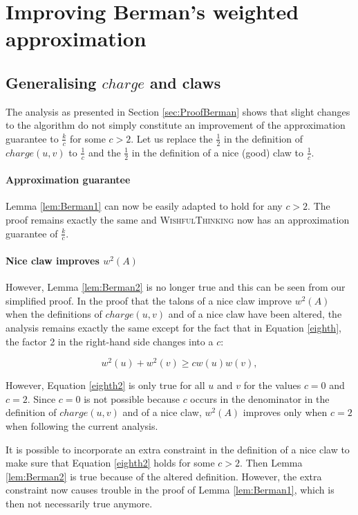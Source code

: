 \section{Improving Berman's weighted approximation}\label{sec:DiscBerman}

\subsection{Generalising $charge$ and claws}\label{subsec:DiscBerman1}

The analysis as presented in Section \ref{sec:ProofBerman} shows that slight changes to the algorithm do not simply constitute an improvement of the approximation guarantee to $\frac{k}{c}$ for some $c > 2$. Let us replace the $\frac{1}{2}$ in the definition of $charge(u,v)$ to $\frac{1}{c}$ and the $\frac{1}{2}$ in the definition of a nice (good) claw to $\frac{1}{c}$.

\paragraph{Approximation guarantee} Lemma \ref{lem:Berman1} can now be easily adapted to hold for any $c>2$. The proof remains exactly the same and \textsc{WishfulThinking} now has an approximation guarantee of $\frac{k}{c}$.

\paragraph{Nice claw improves $w^2(A)$} However, Lemma \ref{lem:Berman2} is no longer true and this can be seen from our simplified proof. In the proof that the talons of a nice claw improve $w^2(A)$ when the definitions of $charge(u,v)$ and of a nice claw have been altered, the analysis remains exactly the same except for the fact that in Equation \eqref{eighth}, the factor 2 in the right-hand side changes into a $c$:

\begin{equation}\label{eighth2}
w^2(u) + w^2(v) \geq cw(u)w(v),
\end{equation}

However, Equation \eqref{eighth2} is only true for all $u$ and $v$ for the values $c=0$ and $c=2$. Since $c=0$ is not possible because $c$ occurs in the denominator in the definition of $charge(u,v)$ and of a nice claw, $w^2(A)$ improves only when $c=2$ when following the current analysis.

It is possible to incorporate an extra constraint in the definition of a nice claw to make sure that Equation \eqref{eighth2} holds for some $c > 2$. Then Lemma \ref{lem:Berman2} is true because of the altered definition. However, the extra constraint now causes trouble in the proof of Lemma \ref{lem:Berman1}, which is then not necessarily true anymore.

